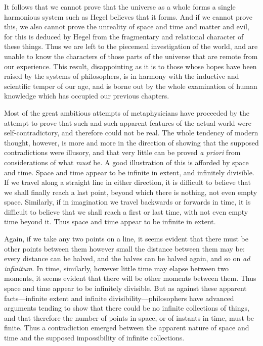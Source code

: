 \documentclass[oneside,letterpaper,12pt]{book}
\begin{document}
It follows that we cannot prove that the universe as a whole forms a
single harmonious system such as Hegel believes that it forms. And if we
cannot prove this, we also cannot prove the unreality of space and time
and matter and evil, for this is deduced by Hegel from the fragmentary
and relational character of these things. \label{piecemeal} Thus we are left to the
piecemeal investigation of the world, and are unable to know the
characters of those parts of the universe that are remote from our
experience. This result, disappointing as it is to those whose hopes
have been raised by the systems of philosophers, is in harmony with the
inductive and scientific temper of our age, and is borne out by the
whole examination of human knowledge which has occupied our previous
chapters.

Most of the great ambitious attempts of metaphysicians have proceeded by
the attempt to prove that such and such apparent features of the actual
world were self-contradictory, and therefore could not be real. The
whole tendency of modern thought, however, is more and more in the
direction of showing that the supposed contradictions were illusory, and
that very little can be proved \emph{a priori} from considerations of
what \emph{must} be. A good illustration of this is afforded by space
and time. Space and time appear to be infinite in extent, and infinitely
divisible. If we travel along a straight line in either direction, it is
difficult to believe that we shall finally reach a last point, beyond
which there is nothing, not even empty space. Similarly, if in
imagination we travel backwards or forwards in time, it is difficult to
believe that we shall reach a first or last time, with not even empty
time beyond it. Thus space and time appear to be infinite in extent.

Again, if we take any two points on a line, it seems evident that there
must be other points between them however small the distance between
them may be: every distance can be halved, and the halves can be halved
again, and so on \emph{ad infinitum}. In time, similarly, however little
time may elapse between two moments, it seems evident that there will be
other moments between them. Thus space and time appear to be infinitely
divisible. But as against these apparent facts---infinite extent and
infinite divisibility---philosophers have advanced arguments tending to
show that there could be no infinite collections of things, and that
therefore the number of points in space, or of instants in time, must be
finite. Thus a contradiction emerged between the apparent nature of
space and time and the supposed impossibility of infinite collections.
\end{document}
